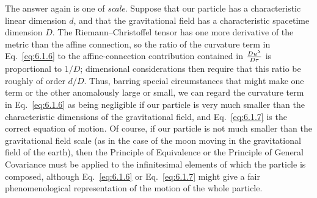 The answer again is one of \emph{scale}. Suppose that our particle has a
characteristic linear dimension \(d\), and that the gravitational field has a
characteristic spacetime dimension \(D\). The Riemann--Christoffel tensor has
one more derivative of the metric than the affine connection, so the ratio of
the curvature term in Eq.~\eqref{eq:6.1.6} to the affine-connection
contribution contained in \(\frac{D u^\lambda}{D\tau}\) is proportional to
\(1/D\); dimensional considerations then require that this ratio be roughly
of order \(d/D\). Thus, barring special circumstances that might make one term
or the other anomalously large or small, we can regard the curvature term in
Eq.~\eqref{eq:6.1.6} as being negligible if our particle is very much smaller
than the characteristic dimensions of the gravitational field, and
Eq.~\eqref{eq:6.1.7} is the correct equation of motion. Of course, if our
particle is not much smaller than the gravitational field scale (as in the
case of the moon moving in the gravitational field of the earth), then the
Principle of Equivalence or the Principle of General Covariance must be
applied to the infinitesimal elements of which the particle is composed,
although Eq.~\eqref{eq:6.1.6} or Eq.~\eqref{eq:6.1.7} might give a fair
phenomenological representation of the motion of the whole particle.
